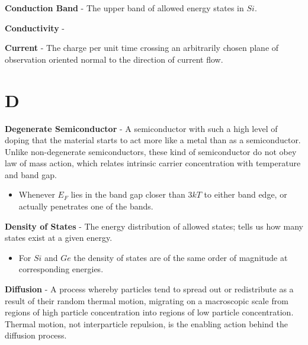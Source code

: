 \vspace{0.5cm}
\noindent
    \textbf{Conduction Band} - The upper band of allowed energy states in $Si$.

\vspace{0.5cm}
\noindent
    \textbf{Conductivity} -

\vspace{0.5cm}
\noindent
    \textbf{Current} - The charge per unit time crossing an arbitrarily chosen plane of observation oriented normal to the direction of current flow.
\section{D}
    \textbf{Degenerate Semiconductor} - A semiconductor with such a high level of doping that the material starts to act more like a metal than as a semiconductor. Unlike non-degenerate semiconductors, these kind of semiconductor do not obey law of mass action, which relates intrinsic carrier concentration with temperature and band gap.
    \vspace{0.15cm}
    \begin{itemize}
        \setlength\itemsep{0.5em}
        \item{Whenever $E_F$ lies in the band gap closer than $3kT$ to either band edge, or actually penetrates one of the bands.}
    \end{itemize}
\vspace{0.5cm}
    \textbf{Density of States} - The energy distribution of allowed states; tells us how many states exist at a given energy.
    \vspace{0.15cm}
    \begin{itemize}
        \setlength\itemsep{0.5em}
        \item{For $Si$ and $Ge$ the density of states are of the same order of magnitude at corresponding energies.}
    \end{itemize}
\vspace{0.5cm}
    \textbf{Diffusion} - A process whereby particles tend to spread out or redistribute as a result of their random thermal motion, migrating on a macroscopic scale from regions of high particle concentration into regions of low particle concentration.  Thermal motion, not interparticle repulsion, is the enabling action behind the diffusion process.

